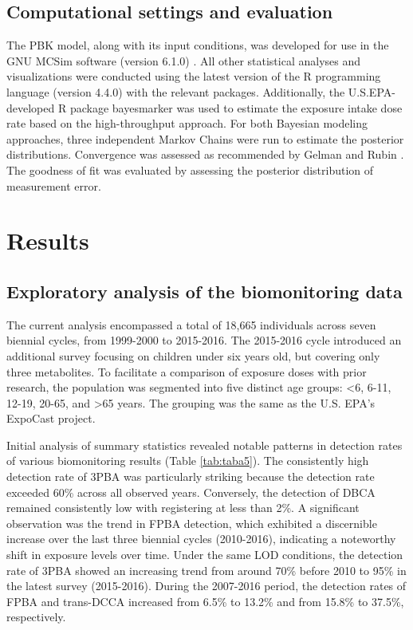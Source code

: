 \documentclass[toxics,article,submit,pdftex,moreauthors]{Definitions/mdpi}
\begin{document}
\subsection{Computational settings and
evaluation}\label{computational-settings-and-evaluation}

The PBK model, along with its input conditions, was developed for use in the
GNU MCSim software (version 6.1.0) \citep{bois_gnu_2009}. All other statistical
analyses and visualizations were conducted using the latest version of the R
programming language (version 4.4.0) with the relevant packages. Additionally,
the U.S.EPA-developed R package bayesmarker \citep{stanfield2022bayesian} was
used to estimate the exposure intake dose rate based on the high-throughput
approach. For both Bayesian modeling approaches, three independent Markov
Chains were run to estimate the posterior distributions. Convergence was
assessed as recommended by Gelman and Rubin \citep{gelman1992inference}. The
goodness of fit was evaluated by assessing the posterior distribution of
measurement error. 

\section{Results}\label{results}

\subsection{Exploratory analysis of the biomonitoring
data}\label{exploratory-analysis-of-the-biomonitoring-data}

The current analysis encompassed a total of 18,665 individuals across
seven biennial cycles, from 1999-2000 to 2015-2016. The 2015-2016 cycle
introduced an additional survey focusing on children under six years old,
but covering only three metabolites. To facilitate a comparison of
exposure doses with prior research, the population was segmented into
five distinct age groups: \textless6, 6-11, 12-19, 20-65, and
\textgreater65 years. The grouping was the same as the U.S. EPA's ExpoCast
project.

Initial analysis of summary statistics revealed notable patterns in
detection rates of various biomonitoring results (Table
\ref{tab:taba5}). The consistently high detection rate of 3PBA was
particularly striking because the detection rate exceeded 60\% across all
observed years. Conversely, the detection of DBCA remained consistently
low with registering at less than 2\%. A significant
observation was the trend in FPBA detection, which exhibited a
discernible increase over the last three biennial cycles (2010-2016),
indicating a noteworthy shift in exposure levels over time. Under the
same LOD conditions, the detection rate of 3PBA showed an increasing
trend from around 70\% before 2010 to 95\% in the latest survey
(2015-2016). During the 2007-2016 period, the detection rates of FPBA
and trans-DCCA increased from 6.5\% to 13.2\% and from 15.8\% to 37.5\%,
respectively.
\end{document}
